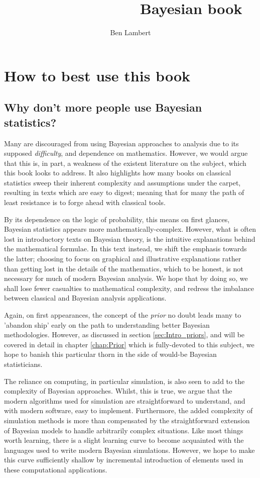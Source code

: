 \documentclass[11pt,fullpage]{book}
\title{\textbf{~~~~~~~~~~~~~~~}\newline Bayesian book}
\author{Ben Lambert}
\begin{document}
\tableofcontents


\chapter{How to best use this book}
\section{Why don't more people use Bayesian statistics?}
Many are discouraged from using Bayesian approaches to analysis due to its supposed \textit{difficulty}, and dependence on mathematics. However, we would argue that this is, in part, a weakness of the existent literature on the subject, which this book looks to address. It also highlights how many books on classical statistics sweep their inherent complexity and assumptions under the carpet, resulting in texts which are easy to digest; meaning that for many the path of least resistance is to forge ahead with classical tools. 

By its dependence on the logic of probability, this means on first glances, Bayesian statistics appears more mathematically-complex. However, what is often lost in introductory texts on Bayesian theory, is the intuitive explanations behind the mathematical formulae. In this text instead, we shift the emphasis towards the latter; choosing to focus on graphical and illustrative explanations rather than getting lost in the details of the mathematics, which to be honest, is not necessary for much of modern Bayesian analysis. We hope that by doing so, we shall lose fewer casualties to mathematical complexity, and redress the imbalance between classical and Bayesian analysis applications.

Again, on first appearances, the concept of the \textit{prior} no doubt leads many to 'abandon ship' early on the path to understanding better Bayesian methodologies. However, as discussed in section \ref{sec:Intro_priors}, and will be covered in detail in chapter \ref{chap:Prior} which is fully-devoted to this subject, we hope to banish this particular thorn in the side of would-be Bayesian statisticians.

The reliance on computing, in particular simulation, is also seen to add to the complexity of Bayesian approaches. Whilst, this is true, we argue that the modern algorithms used for simulation are straightforward to understand, and with modern software, easy to implement. Furthermore, the added complexity of simulation methods is more than compensated by the straightforward extension of Bayesian models to handle arbitrarily complex situations. Like most things worth learning, there is a slight learning curve to become acquainted with the languages used to write modern Bayesian simulations. However, we hope to make this curve sufficiently shallow by incremental introduction of elements used in these computational applications.
\end{document}
